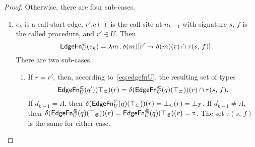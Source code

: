 \begin{proof}
  Otherwise, there are four sub-cases.
  \begin{enumerate}
    \item $e_k$ is a call-start edge, $r'.c()$ is the call site at $n_{k-1}$ with signature $s$, $f$ is the called procedure, and $r'\in U$.
    Then
    \[
      \textsf{EdgeFn}^\Subset_{U}(e_k)=\lambda m\,.\,\delta(m)[r'\to\delta(m)(r)\cap\tau(s,\,f)]\,.
    \]
    There are two sub-cases.
    \begin{enumerate}
      \item\label{item:callstartreceq} If $r=r'$, then, according to~\eqref{eq:edgefnU}, the resulting set of types 
        \[
          \textsf{EdgeFn}^\Subset_{U}(q')(\top_\Subset)(r)=\delta(\textsf{EdgeFn}^\Subset_{U}(q)(\top_\Subset))(r)\cap\tau(s,\,f).
        \]
        If $d_{k-1}=\Lambda$, then $\delta(\textsf{EdgeFn}^\Subset_{U}(q)(\top_\Subset))(r)=\bot_\Subset(r)=\bot_T$. If $d_{k-1}\ne\Lambda$, then $\delta(\textsf{EdgeFn}^\Subset_{U}(q)(\top_\Subset))(r)=\textsf{EdgeFn}^\Subset_{U}(q)(\top_\Subset)(r)=\uptau$. The set $\tau(s,\,f)$ is the same for either case.
    

\end{enumerate}
\end{enumerate}
\end{proof}
